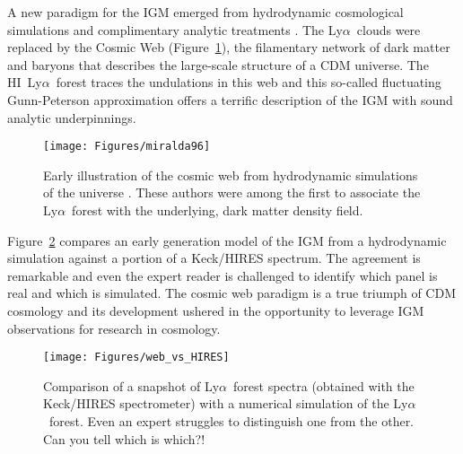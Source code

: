 \documentclass[graybox]{svmult}
\newcommand{\HI}{H{\sc I}}
\def\lya{Ly$\alpha$}
\begin{document}
A new paradigm for the IGM emerged
from hydrodynamic cosmological simulations \cite[]{mco+96}
and complimentary analytic treatments \cite[e.g.][]{HuiGnedin97}.
The \lya\ clouds were replaced by the Cosmic Web (Figure~\ref{fig:web}),
the filamentary network of dark matter and baryons that 
describes the large-scale structure of a CDM universe.
The \HI\ \lya\ forest traces the undulations in this web
and this so-called 
fluctuating Gunn-Peterson approximation
offers a terrific description of the IGM with sound
analytic underpinnings.


%
\begin{figure}[b]
\sidecaption
\texttt{[image: Figures/miralda96]}
%
%
\caption{Early illustration of the cosmic web from 
hydrodynamic simulations of the universe
\cite[]{mco+96}.  These authors were among the first
to associate the \lya\ forest with the underlying, dark
matter density field.
}
\label{fig:web}       %
\end{figure}


Figure~\ref{fig:web_vs_HIRES} compares an early generation
model of the IGM from a hydrodynamic simulation 
against a portion of a Keck/HIRES spectrum.  The
agreement is remarkable and even the expert reader
is challenged to identify which panel is real and
which is simulated.
The cosmic web paradigm is a true triumph of CDM
cosmology and its development ushered in the 
opportunity to leverage IGM observations for research
in cosmology.

%
\begin{figure}[ht]
\sidecaption
\texttt{[image: Figures/web\_vs\_HIRES]}
%
%
\caption{Comparison of a snapshot of \lya\ forest
spectra (obtained with the Keck/HIRES spectrometer)
with a numerical simulation of the \lya\ forest.
Even an expert struggles to distinguish one from the 
other.  Can you tell which is which?!
}
\label{fig:web_vs_HIRES}       %
\end{figure}
\end{document}
